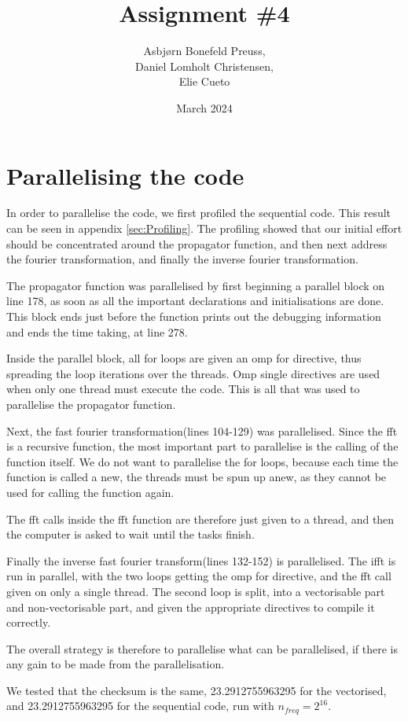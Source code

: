 \documentclass{article}
\title{Assignment \#4}
\author{Asbjørn Bonefeld Preuss,\\ Daniel Lomholt Christensen,\\ Elie Cueto}
\date{March 2024}
\begin{document}
\maketitle
\section{Parallelising the code}\label{sec:taskone}
In order to parallelise the code, we first profiled the sequential code. This result can be seen in appendix \ref{sec:Profiling}. The profiling showed that our initial effort should be concentrated around the propagator function, and then next address the fourier transformation, and finally the inverse fourier transformation.

The propagator function was parallelised by first beginning a parallel block on line 178, as soon as all the important declarations and initialisations are done. This block ends just before the function prints out the debugging information and ends the time taking, at line 278. 

Inside the parallel block, all for loops are given an omp for directive, thus spreading the loop iterations over the threads. Omp single directives are used when only one thread must execute the code. This is all that was used to parallelise the propagator function.

Next, the fast fourier transformation(lines 104-129) was parallelised. Since the fft is a recursive function, the most important part to parallelise is the calling of the function itself. We do not want to parallelise the for loops, because each time the function is called a new, the threads must be spun up anew, as they cannot be used for calling the function again.

The fft calls inside the fft function are therefore just given to a thread, and then the computer is asked to wait until the tasks finish.

Finally the inverse fast fourier transform(lines 132-152) is parallelised. The ifft is run in parallel, with the two loops getting the omp for directive, and the fft call given on only a single thread. The second loop is split, into a vectorisable part and non-vectorisable part, and given the appropriate directives to compile it correctly.

The overall strategy is therefore to parallelise what can be parallelised, if there is any gain to be made from the parallelisation.

We tested that the checksum is the same, 23.2912755963295 for the vectorised, and 23.2912755963295 for the sequential code, run with $n_{freq}=2^{16}$. 
\end{document}

